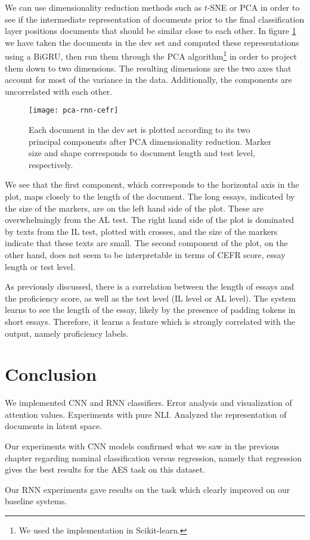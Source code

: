 We can use dimensionality reduction methods such as $t$-SNE or \ac{PCA} in
order to see if the intermediate representation of documents prior to the
final classification layer positions documents that should be similar close
to each other. In figure \ref{fig:pca-rnn-cefr} we have taken the documents
in the dev set and computed these representations using a BiGRU, then run
them through the PCA algorithm\footnote{We used the implementation in
Scikit-learn\autocite{scikit-learn}.} in order to project them down to two
dimensions. The resulting dimensions are the two axes that account for most
of the variance in the data. Additionally, the components are uncorrelated
with each other.

\begin{figure}
  \centering
  \texttt{[image: pca-rnn-cefr]}
  \caption[PCA plot of the vector representations of documents]{
    Each document in the dev set is plotted according to its two principal
    components after PCA dimensionality reduction. Marker size and shape
    corresponds to document length and test level, respectively.
  }
  \label{fig:pca-rnn-cefr}
\end{figure}

We see that the first component, which corresponds to the horizontal axis in
the plot, maps closely to the length of the document. The long essays,
indicated by the size of the markers, are on the left hand side of the plot.
These are overwhelmingly from the AL test. The right hand side of the plot is
dominated by texts from the IL test, plotted with crosses, and the size of
the markers indicate that these texts are small. The second component of the
plot, on the other hand, does not seem to be interpretable in terms of CEFR
score, essay length or test level.

As previously discussed, there is a correlation between the length of essays
and the proficiency score, as well as the test level (IL level or AL level).
The system learns to see the length of the essay, likely by the presence of
padding tokens in short essays. Therefore, it learns a feature which is
strongly correlated with the output, namely proficiency labels.


\section{Conclusion}

We implemented CNN and RNN classifiers.
Error analysis and visualization of attention values.
Experiments with pure NLI.
Analyzed the representation of documents in latent space.

Our experiments with \ac{CNN} models confirmed what we saw in the previous
chapter regarding nominal classification versus regression, namely that
regression gives the best results for the \ac{AES} task on this dataset.

Our \ac{RNN} experiments gave results on the task which clearly improved on
our baseline systems.
